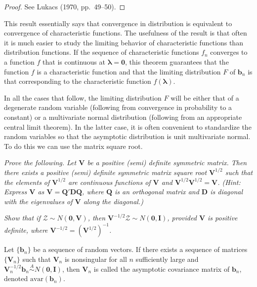 \begin{proof}
See Lukacs (1970, pp.~49--50).
\end{proof}

This result essentially says that convergence in distribution is equivalent
to convergence of characteristic functions. The usefulness of the result is
that often it is much easier to study the limiting behavior of characteristic functions than distribution functions. If the sequence of characteristic
functions $f_n$ converges to a function $f$ that is continuous at $\boldsymbol{\lambda} = \mathbf{0}$, this
theorem guarantees that the function $f$ is a characteristic function and that
the limiting distribution $F$ of $\mathbf{b}_n$ is that corresponding to the characteristic
function $f(\boldsymbol{\lambda})$.

In all the cases that follow, the limiting distribution $F$ will be either that
of a degenerate random variable (following from convergence in probability
to a constant) or a multivariate normal distribution (following from an
appropriate central limit theorem). In the latter case, it is often convenient
to standardize the random variables so that the asymptotic distribution is
unit multivariate normal. To do this we can use the matrix square root.

\begin{exercises}
\item\label{ex:4.18} \textit{Prove the following. Let\/ $\mathbf{V}$ be a positive (semi) definite
symmetric matrix. Then there exists a positive (semi) definite symmetric
matrix square root $\mathbf{V}^{1/2}$ such that the elements of\/ $\mathbf{V}^{1/2}$ are continuous
functions of\/ $\mathbf{V}$ and $\mathbf{V}^{1/2}\mathbf{V}^{1/2} = \mathbf{V}$. (Hint: Express $\mathbf{V}$ as $\mathbf{V} = \mathbf{Q}'\mathbf{D}\mathbf{Q}$, where
$\mathbf{Q}$ is an orthogonal matrix and $\mathbf{D}$ is diagonal with the eigenvalues of\/ $\mathbf{V}$
along the diagonal.)}

\item\label{ex:4.19} \textit{Show that if $\mathcal{Z} \sim N(\mathbf{0}, \mathbf{V})$, then $\mathbf{V}^{-1/2}\mathcal{Z} \sim N(\mathbf{0}, \mathbf{I})$, provided $\mathbf{V}$ is positive definite, where $\mathbf{V}^{-1/2} = (\mathbf{V}^{1/2})^{-1}$.}
\end{exercises}

\begin{definition}\label{def:4.20}
Let $\{\mathbf{b}_n\}$ be a sequence of random vectors. If there exists a sequence of matrices $\{\mathbf{V}_n\}$ such that $\mathbf{V}_n$ is nonsingular for all $n$ sufficiently large and $\mathbf{V}_n^{-1/2}\mathbf{b}_n \overset{A}{\sim} N(\mathbf{0}, \mathbf{I})$, then $\mathbf{V}_n$ is called the asymptotic covariance matrix of $\mathbf{b}_n$, denoted $\mathrm{avar}(\mathbf{b}_n)$.
\end{definition}

